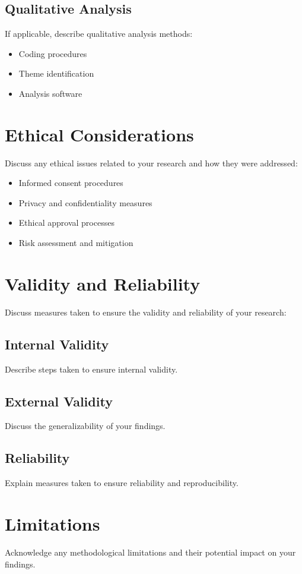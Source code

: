\subsection{Qualitative Analysis}

If applicable, describe qualitative analysis methods:

\begin{itemize}
    \item Coding procedures
    \item Theme identification
    \item Analysis software
\end{itemize}

\section{Ethical Considerations}

Discuss any ethical issues related to your research and how they were addressed:

\begin{itemize}
    \item Informed consent procedures
    \item Privacy and confidentiality measures
    \item Ethical approval processes
    \item Risk assessment and mitigation
\end{itemize}

\section{Validity and Reliability}

Discuss measures taken to ensure the validity and reliability of your research:

\subsection{Internal Validity}
Describe steps taken to ensure internal validity.

\subsection{External Validity}
Discuss the generalizability of your findings.

\subsection{Reliability}
Explain measures taken to ensure reliability and reproducibility.

\section{Limitations}

Acknowledge any methodological limitations and their potential impact on your findings.